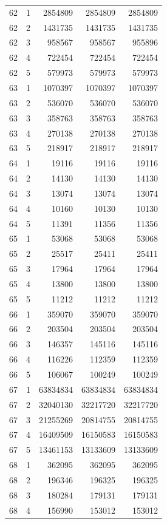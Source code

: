 \begin{longtable}{rrrrr}
62 & 1 & 2854809 & 2854809 & 2854809 \\
62 & 2 & 1431735 & 1431735 & 1431735 \\
62 & 3 & 958567 & 958567 & 955896 \\
62 & 4 & 722454 & 722454 & 722454 \\
62 & 5 & 579973 & 579973 & 579973 \\
63 & 1 & 1070397 & 1070397 & 1070397 \\
63 & 2 & 536070 & 536070 & 536070 \\
63 & 3 & 358763 & 358763 & 358763 \\
63 & 4 & 270138 & 270138 & 270138 \\
63 & 5 & 218917 & 218917 & 218917 \\
64 & 1 & 19116 & 19116 & 19116 \\
64 & 2 & 14130 & 14130 & 14130 \\
64 & 3 & 13074 & 13074 & 13074 \\
64 & 4 & 10160 & 10130 & 10130 \\
64 & 5 & 11391 & 11356 & 11356 \\
65 & 1 & 53068 & 53068 & 53068 \\
65 & 2 & 25517 & 25411 & 25411 \\
65 & 3 & 17964 & 17964 & 17964 \\
65 & 4 & 13800 & 13800 & 13800 \\
65 & 5 & 11212 & 11212 & 11212 \\
66 & 1 & 359070 & 359070 & 359070 \\
66 & 2 & 203504 & 203504 & 203504 \\
66 & 3 & 146357 & 145116 & 145116 \\
66 & 4 & 116226 & 112359 & 112359 \\
66 & 5 & 106067 & 100249 & 100249 \\
67 & 1 & 63834834 & 63834834 & 63834834 \\
67 & 2 & 32040130 & 32217720 & 32217720 \\
67 & 3 & 21255269 & 20814755 & 20814755 \\
67 & 4 & 16409509 & 16150583 & 16150583 \\
67 & 5 & 13461153 & 13133609 & 13133609 \\
68 & 1 & 362095 & 362095 & 362095 \\
68 & 2 & 196346 & 196325 & 196325 \\
68 & 3 & 180284 & 179131 & 179131 \\
68 & 4 & 156990 & 153012 & 153012 \\

\end{longtable}
